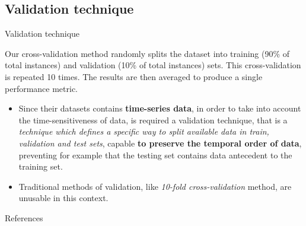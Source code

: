 \documentclass[10pt]{beamer}
\begin{document}
\subsection{Validation technique}
\begin{frame}{Validation technique}

\begin{quoting}[font=itshape, begintext={``}, endtext={''\\\textbf{\citet{ITPAReport}}}]
\justifying
Our cross-validation method randomly splits the dataset into training (90\% of total instances) and validation (10\% of total instances) sets. This cross-validation is repeated 10 times. The results are then averaged to produce a single performance metric. 
\end{quoting}

\begin{itemize}
\justifying
\item Since their datasets contains \textbf{time-series data}, in order to take into account the time-sensitiveness of data, is required a validation technique, that is a \textit{technique which defines a specific way to split available data in train, validation and test sets}, capable \textbf{to preserve the temporal order of data}, preventing for example that the testing set contains data antecedent to the training set.

\item Traditional methods of validation, like \textit{10-fold cross-validation} method, are unusable in this context.
\end{itemize}

\end{frame} 








\begin{frame}[noframenumbering,shrink=15]{References}
\printbibliography
\end{frame}
\end{document}
